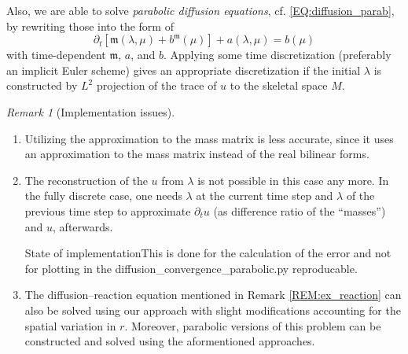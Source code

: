 \documentclass[a4paper, english, 12pt, reqno, draft]{amsart}
\theoremstyle{definition}
\theoremstyle{remark}
\newtheorem{remark}[theorem]{Remark}
\numberwithin{equation}{section}
\newcommand{\skeletalSpace}{\ensuremath{M}}
\newcommand{\mass}{\ensuremath{\mathfrak m}}
\begin{document}
Also, we are able to solve \emph{parabolic diffusion equations}, cf. \eqref{EQ:diffusion_parab}, by rewriting those into the form of
% 
\begin{equation}
 \partial_t \left[ \mass(\lambda, \mu) + b^\mass(\mu) \right] + a(\lambda, \mu) = b(\mu)
\end{equation}
% 
with time-dependent $\mass$, $a$, and $b$. Applying some time discretization (preferably an implicit Euler scheme) gives an appropriate discretization if the initial $\lambda$ is constructed by $L^2$ projection of the trace of $u$ to the skeletal space $\skeletalSpace$.
% 
\begin{remark}[Implementation issues]\
 \begin{enumerate}
  \item Utilizing the approximation to the mass matrix is less accurate, since it uses an approximation to the mass matrix instead of the real bilinear forms.
  \item The reconstruction of the $u$ from $\lambda$ is not possible in this case any more. In the fully discrete case, one needs $\lambda$ at the current time step and $\lambda$ of the previous time step to approximate $\partial_t u$ (as difference ratio of the ``masses'') and $u$, afterwards.
  \begin{envarwarning}{State of implementation}This is done for the calculation of the error and not for plotting in the diffusion\_convergence\_parabolic.py reproducable.\end{envarwarning}
  \item The diffusion--reaction equation mentioned in Remark \ref{REM:ex_reaction} can also be solved using our approach with slight modifications accounting for the spatial variation in $r$. Moreover, parabolic versions of this problem can be constructed and solved using the aformentioned approaches.
 \end{enumerate}
\end{remark}
% 
\end{document}
